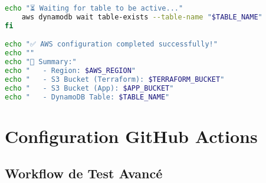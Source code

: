 \begin{lstlisting}[language=bash, caption=aws-config.sh]
    echo "⏳ Waiting for table to be active..."
    aws dynamodb wait table-exists --table-name "$TABLE_NAME"
fi

echo "✅ AWS configuration completed successfully!"
echo ""
echo "📝 Summary:"
echo "   - Region: $AWS_REGION"
echo "   - S3 Bucket (Terraform): $TERRAFORM_BUCKET"
echo "   - S3 Bucket (App): $APP_BUCKET"
echo "   - DynamoDB Table: $TABLE_NAME"
\end{lstlisting}

\section{Configuration GitHub Actions}

\subsection{Workflow de Test Avancé}

